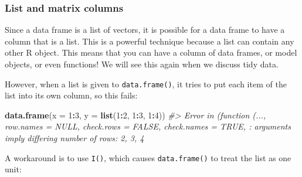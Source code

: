 \documentclass[]{book}
\newenvironment{Shaded}{\begin{snugshade}}{\end{snugshade}}
\newcommand{\KeywordTok}[1]{\textcolor[rgb]{0.13,0.29,0.53}{\textbf{#1}}}
\newcommand{\DataTypeTok}[1]{\textcolor[rgb]{0.13,0.29,0.53}{#1}}
\newcommand{\DecValTok}[1]{\textcolor[rgb]{0.00,0.00,0.81}{#1}}
\newcommand{\StringTok}[1]{\textcolor[rgb]{0.31,0.60,0.02}{#1}}
\newcommand{\CommentTok}[1]{\textcolor[rgb]{0.56,0.35,0.01}{\textit{#1}}}
\newcommand{\OperatorTok}[1]{\textcolor[rgb]{0.81,0.36,0.00}{\textbf{#1}}}
\newcommand{\NormalTok}[1]{#1}
\theoremstyle{definition}
\theoremstyle{definition}
\theoremstyle{definition}
\theoremstyle{remark}
\begin{document}
\subsubsection{List and matrix columns}\label{list-and-matrix-columns}

Since a data frame is a list of vectors, it is possible for a data frame
to have a column that is a list. This is a powerful technique because a
list can contain any other R object. This means that you can have a
column of data frames, or model objects, or even functions! We will see
this again when we discuss tidy data.

\begin{Shaded}
\end{Shaded}

However, when a list is given to \texttt{data.frame()}, it tries to put
each item of the list into its own column, so this fails:

\begin{Shaded}
\begin{Highlighting}[]
\KeywordTok{data.frame}\NormalTok{(}\DataTypeTok{x =} \DecValTok{1}\OperatorTok{:}\DecValTok{3}\NormalTok{, }\DataTypeTok{y =} \KeywordTok{list}\NormalTok{(}\DecValTok{1}\OperatorTok{:}\DecValTok{2}\NormalTok{, }\DecValTok{1}\OperatorTok{:}\DecValTok{3}\NormalTok{, }\DecValTok{1}\OperatorTok{:}\DecValTok{4}\NormalTok{))}
\CommentTok{#> Error in (function (..., row.names = NULL, check.rows = FALSE, check.names = TRUE, : arguments imply differing number of rows: 2, 3, 4}
\end{Highlighting}
\end{Shaded}

A workaround is to use \texttt{I()}, which causes \texttt{data.frame()}
to treat the list as one unit:
\end{document}
